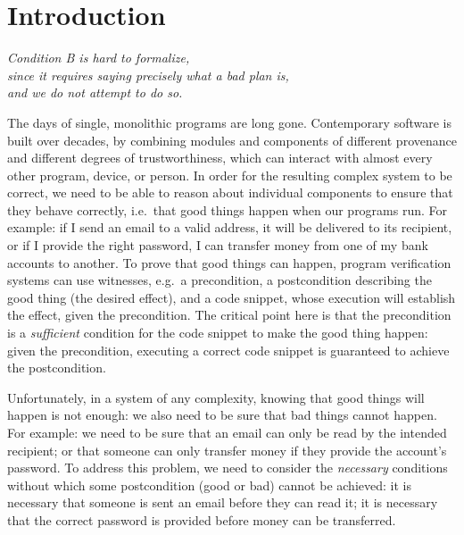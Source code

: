 \renewcommand{\sophia}[2][]{\ponders{Sophia}{blue}{#1} \textcolor{blue}{#2}\xspace}


\section{Introduction}
\label{s:intro}


\begin{flushright}
  \textit{Condition B is hard to formalize, \\since it requires saying precisely what a bad
plan is,\\ and we do not attempt to do so.}\\
 \cite{byzantine}
\end{flushright}

The days of single, monolithic programs are long gone.  Contemporary
software is built over decades, by combining modules and components of
different provenance and different degrees of trustworthiness, which can
interact with almost every other program, device, or person.
In order for the resulting complex system to be correct, we need to be
able to reason about individual components to ensure that they behave
correctly, i.e.\ that good things happen when our programs run.
For example: if I send an email to a valid address, it will be
delivered to its recipient, or if I provide the right password, I can
transfer money from one of my bank accounts to another. 
To prove that good things can
happen, program verification systems can use witnesses, e.g.\ a
precondition, a postcondition describing the good thing (the desired
effect), and a code snippet, whose execution will establish the
effect, given the precondition.  The critical point here is that the
precondition is a \emph{sufficient} condition for the code snippet to
make the good thing happen: given the precondition, executing a
correct code snippet is guaranteed to achieve the postcondition.

Unfortunately, in a system of any complexity, knowing that good things
will happen is not enough: we also need to be sure that bad things
cannot happen. For example: we  need to be sure that an email can
only be read by the intended recipient; or that someone can only transfer
money if they provide the account's password. To address this problem,
we need to consider the \emph{necessary} conditions without which some
postcondition (good or bad) cannot be achieved:
it is necessary that someone is sent an email before they can read it;
it is necessary that the correct password is provided before money can
be transferred.

